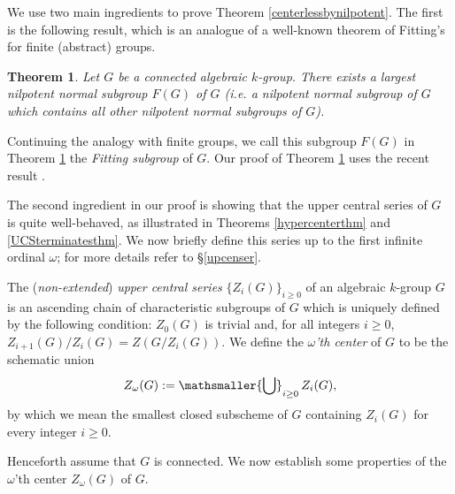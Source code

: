 \documentclass[twoside,a4paper,reqno,11pt]{amsart}
\newtheorem{theorem}{Theorem}[section]
\theoremstyle{definition}
\begin{document}
\vspace{2mm}\noindent We use two main ingredients to prove Theorem \ref{centerlessbynilpotent}. The first is the following result, which is an analogue of a well-known theorem of Fitting's \cite[Thm.\ 14]{Fi} for finite (abstract) groups.

\begin{theorem}\label{largestnilpotentnormsubgp} Let $G$ be a connected algebraic $k$-group. There exists a largest nilpotent normal subgroup $F(G)$ of $G$ (i.e. a nilpotent normal subgroup of $G$ which contains all other nilpotent normal subgroups of $G$). %
\end{theorem}

\noindent Continuing the analogy with finite groups, we call this subgroup $F(G)$ in Theorem \ref{largestnilpotentnormsubgp} the \textit{Fitting subgroup} of $G$. Our proof of Theorem \ref{largestnilpotentnormsubgp} uses the recent result \cite[Thm.\ 1.1]{S}.

\vspace{2mm}\noindent The second ingredient in our proof is showing that the upper central series of $G$ is quite well-behaved, as illustrated in Theorems \ref{hypercenterthm} and \ref{UCSterminatesthm}. We now briefly define this series up to the first infinite ordinal $\omega$; for more details refer to \S \ref{upcenser}.

\vspace{2mm}\noindent The (\textit{non-extended}) \textit{upper central series} $\{Z_i(G)\}_{i\geq 0}$ of an algebraic $k$-group $G$ is an ascending chain of characteristic subgroups of $G$ which is uniquely defined by the following condition: $Z_0(G)$ is trivial and, for all integers $i\geq 0$, $Z_{i+1}(G)/Z_i(G)=Z(G/Z_i(G))$. We define the \textit{$\omega$'th center} of $G$ to be the schematic union $$Z_\omega(G):=\mathsmaller{\bigcup}_{i\geq 0}\,Z_i(G),$$ by which we mean the smallest closed subscheme of $G$ containing $Z_i(G)$ for every integer $i\geq 0$. 

\vspace{2mm}\noindent Henceforth assume that $G$ is connected. We now establish some properties of the $\omega$'th center $Z_\omega(G)$ of $G$.
\end{document}
